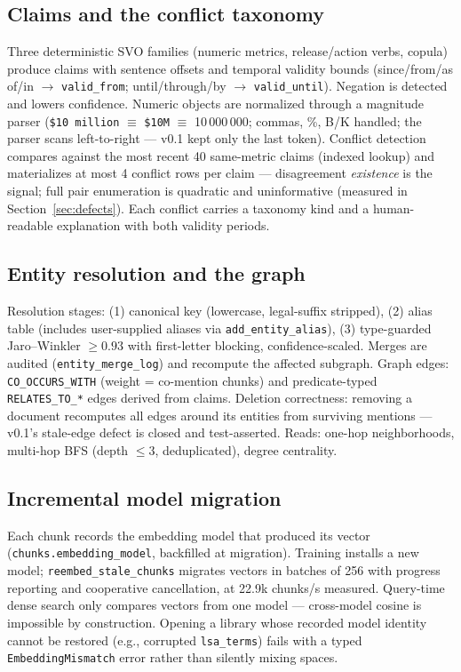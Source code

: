 \subsection{Claims and the conflict taxonomy}\label{sec:claims}

Three deterministic SVO families (numeric metrics, release/action verbs,
copula) produce claims with sentence offsets and temporal validity bounds
(since/from/as of/in $\rightarrow$ \texttt{valid\_from};
until/through/by $\rightarrow$ \texttt{valid\_until}). Negation is detected
and lowers confidence. Numeric objects are normalized through a magnitude
parser (\texttt{\$10 million} $\equiv$ \texttt{\$10M} $\equiv$ 10\,000\,000;
commas, \%, B/K handled; the parser scans left-to-right --- v0.1 kept only the
last token). Conflict detection compares against the most recent 40
same-metric claims (indexed lookup) and materializes at most 4 conflict rows
per claim --- disagreement \emph{existence} is the signal; full pair
enumeration is quadratic and uninformative (measured in
Section~\ref{sec:defects}). Each conflict carries a taxonomy kind and a
human-readable explanation with both validity periods.

\subsection{Entity resolution and the graph}\label{sec:entities}

Resolution stages: (1) canonical key (lowercase, legal-suffix stripped),
(2) alias table (includes user-supplied aliases via
\texttt{add\_entity\_alias}), (3) type-guarded Jaro--Winkler $\geq 0.93$ with
first-letter blocking, confidence-scaled. Merges are audited
(\texttt{entity\_merge\_log}) and recompute the affected subgraph. Graph
edges: \texttt{CO\_OCCURS\_WITH} (weight = co-mention chunks) and
predicate-typed \texttt{RELATES\_TO\_*} edges derived from claims. Deletion
correctness: removing a document recomputes all edges around its entities
from surviving mentions --- v0.1's stale-edge defect is closed and
test-asserted. Reads: one-hop neighborhoods, multi-hop BFS (depth $\leq 3$,
deduplicated), degree centrality.

\subsection{Incremental model migration}\label{sec:migration}

Each chunk records the embedding model that produced its vector
(\texttt{chunks.embedding\_model}, backfilled at migration). Training
installs a new model; \texttt{reembed\_stale\_chunks} migrates vectors in
batches of 256 with progress reporting and cooperative cancellation, at
22.9k chunks/s measured. Query-time dense search only compares vectors from
one model --- cross-model cosine is impossible by construction. Opening a
library whose recorded model identity cannot be restored (e.g., corrupted
\texttt{lsa\_terms}) fails with a typed \texttt{EmbeddingMismatch} error
rather than silently mixing spaces.

